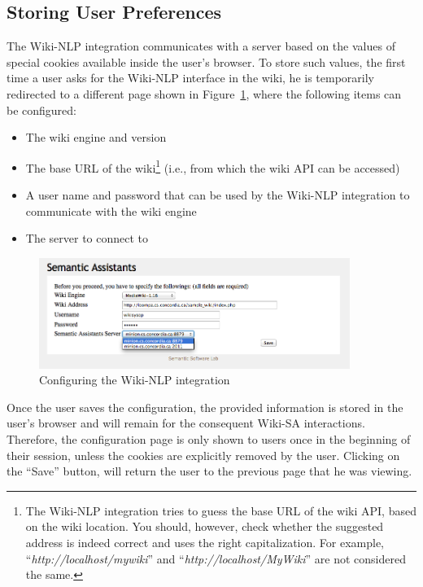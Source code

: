 \subsection{Storing User Preferences} The Wiki-NLP integration communicates with a \sa server based on the values of special cookies available inside the user's browser. To store such values, the first time a user asks for the Wiki-NLP interface in the wiki, he is temporarily redirected to a different page shown in Figure~\ref{fig:wiki_config}, where the following items can be configured:

\begin{itemize}\itemsep1mm
\item The wiki engine and version
\item The base URL of the wiki\footnote{The Wiki-NLP integration tries to guess the base URL of the wiki API, based on the wiki location. You should, however, check whether the suggested address is indeed correct and uses the right capitalization. For example, ``\emph{http://localhost/mywiki}'' and ``\emph{http://localhost/MyWiki}'' are not considered the same.} (i.e., from which the wiki API can be accessed)
\item A user name and password that can be used by the Wiki-NLP integration to communicate with the wiki engine
\item The \sa server to connect to
\end{itemize}

\begin{figure}[ht]
\centering
\includegraphics[width=0.9\textwidth]{pictures/wiki_config.png}
\caption{Configuring the Wiki-NLP integration}
\label{fig:wiki_config}
\end{figure}

Once the user saves the configuration, the provided information is stored in the user's browser and will remain for the consequent Wiki-SA interactions. Therefore, the configuration page is only shown to users once in the beginning of their session, unless the cookies are explicitly removed by the user. Clicking on the ``Save'' button, will return the user to the previous page that he was viewing.

